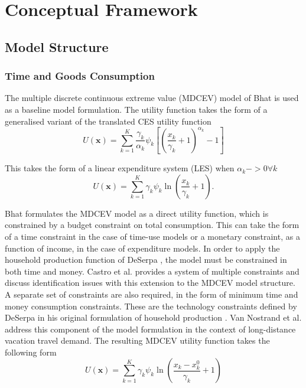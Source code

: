 \chapter{Conceptual Framework}
\section{Model Structure}
\subsection{Time and Goods Consumption}
The multiple discrete continuous extreme value (MDCEV) model of Bhat \cite{Bhat2005, Bhat2008TheExtensions} is used as a baseline model formulation. The utility function takes the form of a generalised variant of the translated CES utility function
\begin{equation}
    U(\textbf{x}) = \sum_{k=1}^K \frac{\gamma_k}{\alpha_k}\psi_k \left[\left(\frac{x_k}{\gamma_k}+1\right)^{\alpha_k} - 1\right]
\end{equation}

This takes the form of a linear expenditure system (LES) when $\alpha_k -> 0 \forall k$
\begin{equation}
    U(\textbf{x}) = \sum_{k=1}^K \gamma_k \psi_k \ln \left(\frac{x_k}{\gamma_k}+1\right) .
\end{equation}

Bhat formulates the MDCEV model as a direct utility function, which is constrained by a budget constraint on total consumption. This can take the form of a time constraint in the case of time-use models or a monetary constraint, as a function of income, in the case of expenditure models. In order to apply the household production function of DeSerpa \cite{DeSerpa1971}, the model must be constrained in both time and money. Castro et al. \cite{Castro2012AccommodatingModel} provides a system of multiple constraints and discuss identification issues with this extension to the MDCEV model structure. A separate set of constraints are also required, in the form of minimum time and money consumption constraints. These are the technology constraints defined by DeSerpa in his original formulation of household production \cite{DeSerpa1971}. Van Nostrand et al. \cite{VanNostrand2013AnalysisFramework} address this component of the model formulation in the context of long-distance vacation travel demand. The resulting MDCEV utility function takes the following form
\begin{equation}
    U(\textbf{x}) = \sum_{k=1}^K \gamma_k \psi_k \ln \left(\frac{x_k - x_k^0}{\gamma_k}+1\right)
\end{equation}

